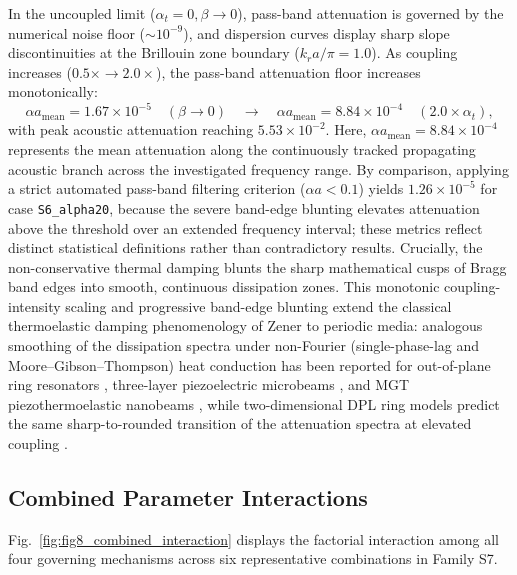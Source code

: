 \documentclass[11pt,a4paper]{article}
\begin{document}
In the uncoupled limit ($\alpha_t = 0, \beta \to 0$), pass-band attenuation is governed by the numerical noise floor ($\sim 10^{-9}$), and dispersion curves display sharp slope discontinuities at the Brillouin zone boundary ($k_r a / \pi = 1.0$). As coupling increases ($0.5\times \to 2.0\times$), the pass-band attenuation floor increases monotonically:
\begin{equation}
\alpha a_{\text{mean}} = 1.67 \times 10^{-5} \quad (\beta \to 0) \quad \longrightarrow \quad \alpha a_{\text{mean}} = 8.84 \times 10^{-4} \quad (2.0\times \alpha_t),
\end{equation}
with peak acoustic attenuation reaching $5.53 \times 10^{-2}$. Here, $\alpha a_{\text{mean}} = 8.84 \times 10^{-4}$ represents the mean attenuation along the continuously tracked propagating acoustic branch across the investigated frequency range. By comparison, applying a strict automated pass-band filtering criterion ($\alpha a < 0.1$) yields $1.26 \times 10^{-5}$ for case \texttt{S6\_alpha20}, because the severe band-edge blunting elevates attenuation above the threshold over an extended frequency interval; these metrics reflect distinct statistical definitions rather than contradictory results. Crucially, the non-conservative thermal damping blunts the sharp mathematical cusps of Bragg band edges into smooth, continuous dissipation zones. This monotonic coupling-intensity scaling and progressive band-edge blunting extend the classical thermoelastic damping phenomenology of Zener \cite{zener1937internal} to periodic media: analogous smoothing of the dissipation spectra under non-Fourier (single-phase-lag and Moore--Gibson--Thompson) heat conduction has been reported for out-of-plane ring resonators \cite{shao2026singlephaselag, kareem2025thermoelastic}, three-layer piezoelectric microbeams \cite{liu2024ted}, and MGT piezothermoelastic nanobeams \cite{srivastava2024damping}, while two-dimensional DPL ring models predict the same sharp-to-rounded transition of the attenuation spectra at elevated coupling \cite{zhou2025comprehensive}.

\subsection{Combined Parameter Interactions}
\label{sec:res_s7}

Fig.~\ref{fig:fig8_combined_interaction} displays the factorial interaction among all four governing mechanisms across six representative combinations in Family S7.
\end{document}
